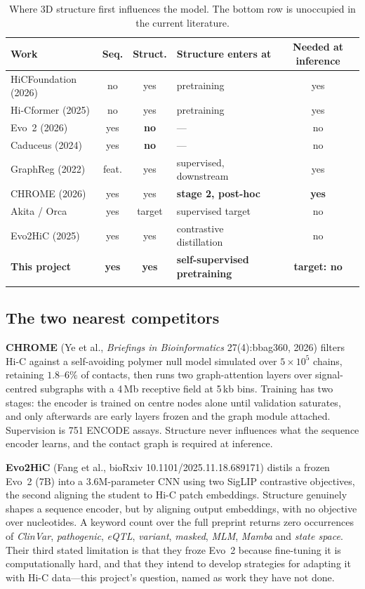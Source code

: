 \documentclass[11pt,a4paper]{article}
\begin{document}
\begin{longtable}{@{}p{4.6cm}ccp{3.4cm}c@{}}
\toprule
\textbf{Work} & \textbf{Seq.} & \textbf{Struct.} & \textbf{Structure enters at} & \textbf{Needed at inference} \\
\midrule
\endhead
HiCFoundation (2026) & no & yes & pretraining & yes \\
Hi-Cformer (2025) & no & yes & pretraining & yes \\
Evo~2 (2026) & yes & \textbf{no} & --- & no \\
Caduceus (2024) & yes & \textbf{no} & --- & no \\
GraphReg (2022) & feat. & yes & supervised, downstream & yes \\
CHROME (2026) & yes & yes & \textbf{stage 2, post-hoc} & \textbf{yes} \\
Akita / Orca & yes & target & supervised target & no \\
Evo2HiC (2025) & yes & yes & contrastive distillation & no \\
\midrule
\textbf{This project} & \textbf{yes} & \textbf{yes} & \textbf{self-supervised pretraining} & \textbf{target: no} \\
\bottomrule
\caption{Where 3D structure first influences the model. The bottom row is
unoccupied in the current literature.}
\end{longtable}

\subsection{The two nearest competitors}

\textbf{CHROME} (Ye et al., \emph{Briefings in Bioinformatics} 27(4):bbag360,
2026) filters Hi-C against a self-avoiding polymer null model simulated over
$5\times10^5$ chains, retaining $1.8$--$6\%$ of contacts, then runs two
graph-attention layers over signal-centred subgraphs with a 4\,Mb receptive
field at 5\,kb bins. Training has two stages: the encoder is trained on centre
nodes alone until validation saturates, and only afterwards are early layers
frozen and the graph module attached. Supervision is 751 ENCODE assays. Structure
never influences what the sequence encoder learns, and the contact graph is
required at inference.

\textbf{Evo2HiC} (Fang et al., bioRxiv 10.1101/2025.11.18.689171) distils a
frozen Evo~2 (7B) into a 3.6M-parameter CNN using two SigLIP contrastive
objectives, the second aligning the student to Hi-C patch embeddings. Structure
genuinely shapes a sequence encoder, but by aligning output embeddings, with no
objective over nucleotides. A keyword count over the full preprint returns zero
occurrences of \emph{ClinVar}, \emph{pathogenic}, \emph{eQTL}, \emph{variant},
\emph{masked}, \emph{MLM}, \emph{Mamba} and \emph{state space}. Their third
stated limitation is that they froze Evo~2 because fine-tuning it is
computationally hard, and that they intend to develop strategies for adapting it
with Hi-C data---this project's question, named as work they have not done.
\end{document}
